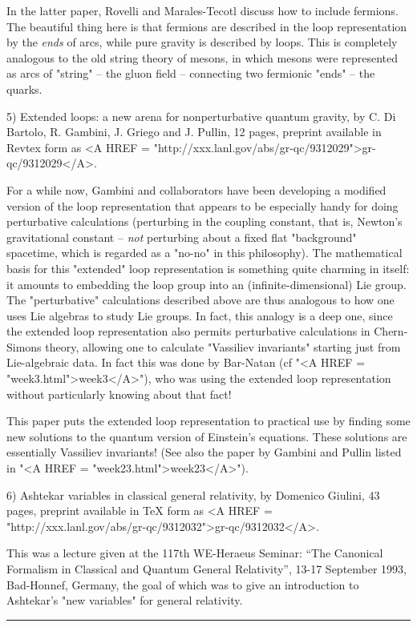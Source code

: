 In the latter paper, Rovelli and Marales-Tecotl discuss how to include
fermions.  The beautiful thing here is that fermions are described
in the loop representation by the \emph{ends} of arcs, while pure gravity is
described by loops.  This is completely analogous to the old string
theory of mesons, in which mesons were represented as arcs of "string"
-- the gluon field -- connecting two fermionic "ends" -- the quarks.  

5) Extended loops: a new arena for nonperturbative quantum gravity, 
by C. Di Bartolo, R. Gambini, J. Griego and J. Pullin, 12 pages,
preprint available in Revtex form as <A HREF = "http://xxx.lanl.gov/abs/gr-qc/9312029">gr-qc/9312029</A>.

For a while now, Gambini and collaborators have been developing a
modified version of the loop representation that appears to be
especially handy for doing perturbative calculations (perturbing in the
coupling constant, that is, Newton's gravitational constant -- \emph{not}
perturbing about a fixed flat "background" spacetime, which is regarded
as a "no-no" in this philosophy).  The mathematical basis for this
"extended" loop representation is something quite charming in itself: it
amounts to embedding the loop group into an (infinite-dimensional) Lie
group.  The "perturbative" calculations described above are thus
analogous to how one uses Lie algebras to study Lie groups.  In fact,
this analogy is a deep one, since the extended loop representation also
permits perturbative calculations in Chern-Simons theory, allowing one
to calculate "Vassiliev invariants" starting just from Lie-algebraic
data.  In fact this was done by Bar-Natan (cf "<A HREF = "week3.html">week3</A>"), who was using
the extended loop representation without particularly knowing about that
fact!

This paper puts the extended loop representation to practical use by
finding some new solutions to the quantum version of Einstein's
equations.   These solutions are essentially Vassiliev invariants!
(See also the paper by Gambini and Pullin listed in "<A HREF = "week23.html">week23</A>").  

6) Ashtekar variables in classical general relativity, by Domenico
Giulini, 43 pages, preprint available in TeX form as <A HREF = "http://xxx.lanl.gov/abs/gr-qc/9312032">gr-qc/9312032</A>.

This was a lecture given at the 117th WE-Heraeus Seminar: ``The Canonical
Formalism in Classical and Quantum General Relativity'', 13-17
September 1993, Bad-Honnef, Germany, the goal of which was to give an
introduction to Ashtekar's "new variables" for general relativity.
\par\noindent\rule{\textwidth}{0.4pt}

